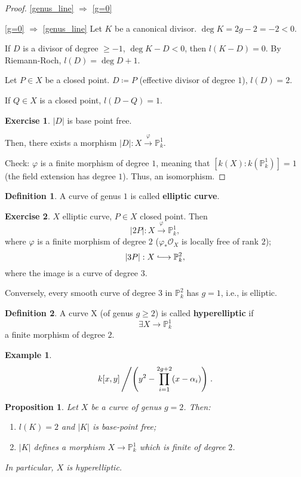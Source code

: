 \documentclass[12pt]{article}
\newtheorem*{proposition}{Proposition}
\theoremstyle{definition}
\newtheorem*{definition}{Definition}
\newtheorem*{exercise}{Exercise}
\newtheorem*{example}{Example}
\begin{document}
\begin{proof}
\ref{genus_line} $\Rightarrow$ \ref{g=0} \checkmark

\ref{g=0} $\Rightarrow$ \ref{genus_line} Let $K$ be a canonical divisor. $\deg K=2g-2=-2<0$.

If $D$ is a divisor of degree $\geq-1$, $\deg K-D<0$, then $l(K-D)=0$. By Riemann-Roch, $l(D)=\deg D+1$.

Let $P\in X$ be a closed point. $D\coloneqq P$ (effective divisor of degree $1$), $l(D)=2$.

If $Q\in X$ is a closed point, $l(D-Q)=1$.

\begin{exercise}
$|D|$ is base point free.
\end{exercise}

Then, there exists a morphism $|D|:X\xrightarrow\varphi\mathbb P_k^1$.

Check: $\varphi$ is a finite morphism of degree $1$, meaning that $[k(X):k(\mathbb P_k^1)]=1$ (the field extension has degree $1$). Thus, an isomorphism.
\end{proof}

\begin{definition}
A curve of genus $1$ is called \textbf{elliptic curve}.
\end{definition}

\begin{exercise}
$X$ elliptic curve, $P\in X$ closed point. Then
\[|2P|:X\overset\varphi\longrightarrow\mathbb P_k^1,\]
where $\varphi$ is a finite morphism of degree $2$ ($\varphi_*\mathcal O_X$ is locally free of rank $2$);
\[|3P|:X\lhook\joinrel\longrightarrow\mathbb P_k^2,\]
where the image is a curve of degree $3$.

Conversely, every smooth curve of degree $3$ in $\mathbb P_k^2$ has $g=1$, i.e., is elliptic.
\end{exercise}

\begin{definition}
A curve X (of genus $g\geq2$) is called \textbf{hyperelliptic} if
\[\exists X\longrightarrow\mathbb P_k^1\]
a finite morphism of degree $2$.
\end{definition}

\begin{example}
\[k[x,y]\left/\left(y^2-\prod_{i=1}^{2g+2}(x-\alpha_i)\right)\right..\]
\end{example}

\begin{proposition}
Let $X$ be a curve of genus $g=2$. Then:
\begin{enumerate}[label=\arabic*)]
\item $l(K)=2$ and $|K|$ is base-point free;
\item $|K|$ defines a morphism $X\rightarrow\mathbb P_k^1$ which is finite of degree $2$.
\end{enumerate}
In particular, $X$ is hyperelliptic.
\end{proposition}
\end{document}
